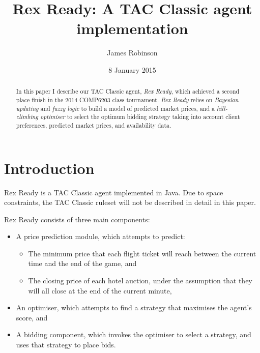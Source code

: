 \documentclass{acm_proc_article-sp}
\begin{document}
\title{Rex Ready: A TAC Classic agent implementation}
\author{
  \alignauthor
  James Robinson\\
}
\date{8 January 2015}
\maketitle

\begin{abstract}
  In this paper I describe our TAC Classic agent, \emph{Rex Ready}, which achieved a second place finish in the 2014 COMP6203 class tournament. \emph{Rex Ready} relies on \emph{Bayesian updating} and \emph{fuzzy logic} to build a model of predicted market prices, and a \emph{hill-climbing optimiser} to select the optimum bidding strategy taking into account client preferences, predicted market prices, and availability data.
\end{abstract}


\section{Introduction}

Rex Ready is a TAC Classic agent implemented in Java. Due to space constraints, the TAC Classic ruleset will not be described in detail in this paper.

Rex Ready consists of three main components:

\begin{itemize}
  \item A price prediction module, which attempts to predict:
  \begin{itemize}
    \item The minimum price that each flight ticket will reach between the current time and the end of the game, and
    \item The closing price of each hotel auction, under the assumption that they will all close at the end of the current minute,
  \end{itemize}
  \item An optimiser, which attempts to find a strategy that maximises the agent's score, and
  \item A bidding component, which invokes the optimiser to select a strategy, and uses that strategy to place bids.
\end{itemize}
\end{document}
